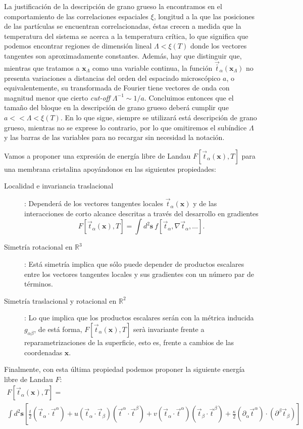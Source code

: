 La justificación de la descripción de grano grueso la encontramos en el
comportamiento de las correlaciones espaciales $\xi$, longitud a la que las
posiciones de las partículas se encuentran correlacionadas, éstas crecen a
medida que la temperatura del sistema se acerca a la temperatura crítica, lo
que significa que podemos encontrar regiones de dimensión lineal
$\Lambda<\xi(T)$ donde los vectores tangentes son aproximadamente
constantes. Además, hay que distinguir que, mientras que tratamos a
$\mathbf{x}_{\Lambda}$ como una variable continua, la función 
$\vec{\bar{t}}_{\alpha}(\mathbf{x}_{\Lambda})$ no presenta variaciones a distancias
del orden del espaciado microscópico $a$, o equivalentemente, su transformada
de Fourier tiene vectores de onda con magnitud menor que cierto \textit{cut-off}
$\Lambda^{-1} \sim 1/a$. Concluimos entonces que el tamaño del bloque en la
descripción de grano grueso deberá cumplir que $a<<\Lambda<\xi(T)$. En lo que
sigue, siempre se utilizará está descripción de grano grueso, mientras no se
exprese lo contrario, por lo que omitiremos el subíndice $\Lambda$ y las
barras de las variables para no recargar sin necesidad la notación.

Vamos a proponer una expresión de energía libre de Landau
$F[\vec{t}_{\alpha}(\mathbf{x}),T]$ para una membrana cristalina
apoyándonos en las siguientes propiedades:
\begin{description}
\item[Localidad e invariancia traslacional]: Dependerá de los vectores
  tangentes locales $\vec{t}_{\alpha}(\mathbf{x})$ y de las
  interacciones de corto alcance descritas a través del desarrollo en gradientes
  $$ F[\vec{t}_{\alpha}(\mathbf{x}),T]=\int\! d^2\mathbf{s}\ f[\vec{t}_{\alpha},\nabla
  \vec{t}_{\alpha},\dots].$$ 
\item[Simetría rotacional en $\mathbb{R}^3$]: Está simetría implica que sólo
  puede depender de productos escalares entre los vectores tangentes
  locales y sus gradientes con un número par de términos. 

\item[Simetría traslacional y rotacional en $\mathbb{R}^2$]: Lo que implica
  que los productos escalares serán con la métrica inducida $g_{\alpha\beta}$,
  de está forma, $F[\vec{t}_{\alpha}(\mathbf{x}),T]$ serà invariante frente a
  reparametrizaciones de la superficie, esto es, frente a cambios de 
  las coordenadas $\mathbf{x}$.
\end{description}

 Finalmente, con esta última propiedad podemos proponer la siguiente energía libre de Landau $F$:
  \begin{multline}\label{ELandau}
    F[\vec{t}_{\alpha}(\mathbf{x}),T]=\\
\int d^2\mathbf{s}
    \left[
      \frac{t}{2}(\vec{t}_{\alpha}\cdot\vec{t}^{\alpha})+
      u(\vec{t}_{\alpha}\cdot\vec{t}_{\beta})(\vec{t}^{\alpha}\cdot\vec{t}^{\beta})+
      v(\vec{t}_{\alpha}\cdot\vec{t}^{\alpha})(\vec{t}_{\beta}\cdot\vec{t}^{\beta})+
      \frac{\kappa}{2}(\partial_{\alpha}\vec{t}^{\alpha})\cdot(\partial^{\beta}\vec{t}_{\beta}) \right]
  \end{multline}


